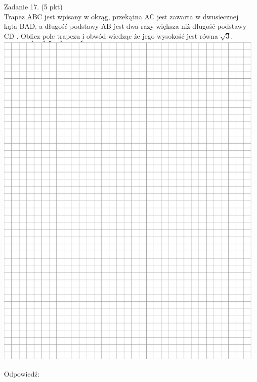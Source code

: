 \documentclass[10pt]{article}
\begin{document}
Zadanie 17. (5 pkt)\\
Trapez ABC jest wpisany w okrąg, przekątna AC jest zawarta w dwusiecznej kąta BAD, a długość podstawy AB jest dwa razy większa niż długość podstawy CD . Oblicz pole trapezu i obwód wiedząc że jego wysokość jest równa \(\sqrt{3}\).\\
\includegraphics[max width=\textwidth, center]{2024_11_21_caad0d2d07cc5c30818fg-15}

Odpowiedź:
\end{document}
